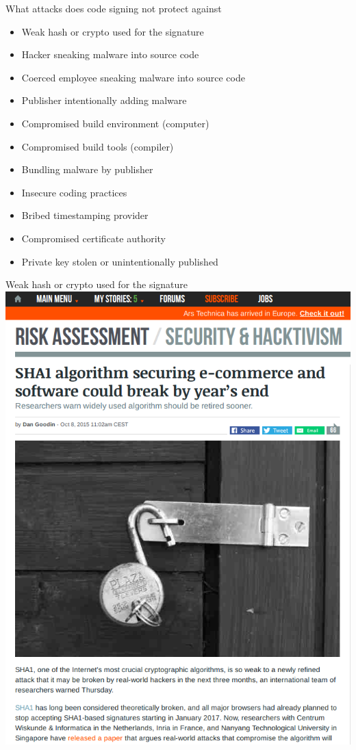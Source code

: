 \documentclass[11pt]{beamer}
\begin{document}
\begin{frame}{What attacks does code signing not protect against}
\begin{itemize}
\item Weak hash or crypto used for the signature
\item Hacker sneaking malware into source code
\item Coerced employee sneaking malware into source code
\item Publisher intentionally adding malware
\item Compromised build environment (computer)
\item Compromised build tools (compiler)
\item Bundling malware by publisher
\item Insecure coding practices
\item Bribed timestamping provider
\item Compromised certificate authority
\item Private key stolen or unintentionally published
\end{itemize}
\end{frame}

\begin{frame}{Weak hash or crypto used for the signature}
\includegraphics[scale=0.27]{sha1.png}
\end{frame}
\end{document}
